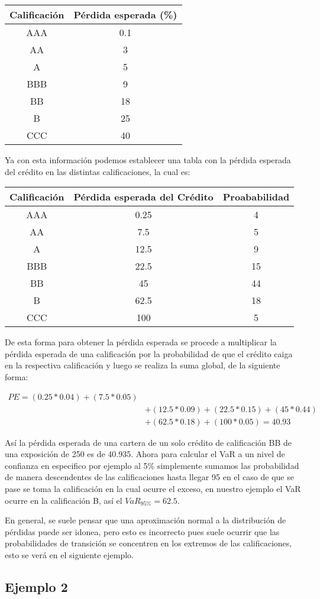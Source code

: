\documentclass[
  12pt,
]{krantz}
\theoremstyle{definition}
\theoremstyle{definition}
\theoremstyle{definition}
\theoremstyle{remark}
\begin{document}
\begin{longtable}[]{@{}cc@{}}
\toprule
Calificación & Pérdida esperada (\%)\tabularnewline
\midrule
\endhead
AAA & 0.1\tabularnewline
AA & 3\tabularnewline
A & 5\tabularnewline
BBB & 9\tabularnewline
BB & 18\tabularnewline
B & 25\tabularnewline
CCC & 40\tabularnewline
\bottomrule
\end{longtable}

Ya con esta información podemos establecer una tabla con la pérdida esperada del crédito en las distintas calificaciones, la cual es:

\begin{longtable}[]{@{}ccc@{}}
\toprule
Calificación & Pérdida esperada del Crédito & Proababilidad\tabularnewline
\midrule
\endhead
AAA & 0.25 & 4\tabularnewline
AA & 7.5 & 5\tabularnewline
A & 12.5 & 9\tabularnewline
BBB & 22.5 & 15\tabularnewline
BB & 45 & 44\tabularnewline
B & 62.5 & 18\tabularnewline
CCC & 100 & 5\tabularnewline
\bottomrule
\end{longtable}

De esta forma para obtener la pérdida esperada se procede a multiplicar la pérdida esperada de una calificación por la probabilidad de que el crédito caiga en la respectiva calificación y luego se realiza la suma global, de la siguiente forma:

\begin{align*} 
PE = (0.25*0.04)+(7.5*0.05)& \\
&+(12.5*0.09)+(22.5*0.15)+(45*0.44)&\\
&+(62.5*0.18) +(100*0.05)=40.93
\end{align*}

Así la pérdida esperada de una cartera de un solo crédito de calificación BB de una exposición de 250 es de 40.935. Ahora para calcular el VaR a un nivel de confianza en especifico por ejemplo al 5\% simplemente sumamos las probabilidad de manera descendentes de las calificaciones hasta llegar 95 en el caso de que se pase se toma la calificación en la cual ocurre el exceso, en nuestro ejemplo el VaR ocurre en la calificación B, así el \(VaR_{95\%}=62.5\).

En general, se suele pensar que una aproximación normal a la distribución de pérdidas puede ser idonea, pero esto es incorrecto pues suele ocurrir que las probabilidades de transición se concentren en los extremos de las calificaciones, esto se verá en el siguiente ejemplo.

\hypertarget{ejemplo-2}{%
\subsection{Ejemplo 2}\label{ejemplo-2}}
\end{document}
